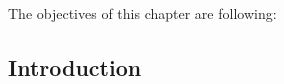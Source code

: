 \chapter{}

\label{Chapter3} %


The objectives of this chapter are following:


\section{Introduction}




    